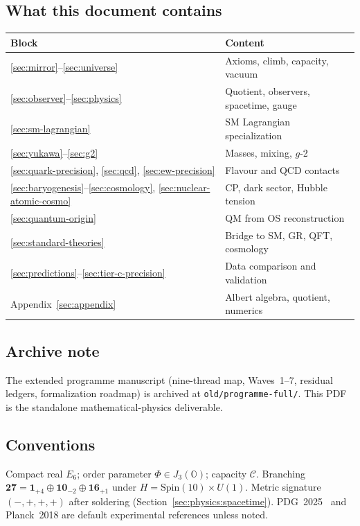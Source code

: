 \documentclass[aps,prd,onecolumn,amsmath,amssymb,nofootinbib,11pt]{revtex4-2}
\numberwithin{equation}{section}
\theoremstyle{plain}
\theoremstyle{definition}
\theoremstyle{remark}
\newcommand{\jalg}{J_3(\mathbb{O})}
\newcommand{\Spin}{\mathrm{Spin}}
\newcommand{\capacity}{\mathcal{C}}
\newcommand{\orderparam}{\Phi}
\begin{document}
\subsection{What this document contains}

\begin{center}
\small
\renewcommand{\arraystretch}{1.12}
\begin{tabular}{@{}ll@{}}
\toprule
\textbf{Block} & \textbf{Content} \\
\midrule
\ref{sec:mirror}--\ref{sec:universe} &
  Axioms, climb, capacity, vacuum \\
\ref{sec:observer}--\ref{sec:physics} &
  Quotient, observers, spacetime, gauge \\
\ref{sec:sm-lagrangian} &
  SM Lagrangian specialization \\
\ref{sec:yukawa}--\ref{sec:g2} &
  Masses, mixing, $g$-2 \\
\ref{sec:quark-precision}, \ref{sec:qcd}, \ref{sec:ew-precision} &
  Flavour and QCD contacts \\
\ref{sec:baryogenesis}--\ref{sec:cosmology}, \ref{sec:nuclear-atomic-cosmo} &
  CP, dark sector, Hubble tension \\
\ref{sec:quantum-origin} &
  QM from OS reconstruction \\
\ref{sec:standard-theories} &
  Bridge to SM, GR, QFT, cosmology \\
\ref{sec:predictions}--\ref{sec:tier-c-precision} &
  Data comparison and validation \\
Appendix~\ref{sec:appendix} &
  Albert algebra, quotient, numerics \\
\bottomrule
\end{tabular}
\end{center}

\subsection{Archive note}

The extended programme manuscript (nine-thread map, Waves~1--7, residual
ledgers, formalization roadmap) is archived at
\texttt{old/programme-full/}. This PDF is the standalone mathematical-physics
deliverable.

\subsection{Conventions}

Compact real $E_6$; order parameter $\orderparam\in\jalg$; capacity
$\capacity$. Branching
$\mathbf{27}=\mathbf{1}_{+4}\oplus\mathbf{10}_{-2}\oplus\mathbf{16}_{+1}$
under $H=\Spin(10)\times U(1)$. Metric signature $(-,+,+,+)$ after soldering
(Section~\ref{sec:physics:spacetime}). PDG~2025~\cite{PDG2025} and Planck~2018
are default experimental references unless noted.%
\end{document}
